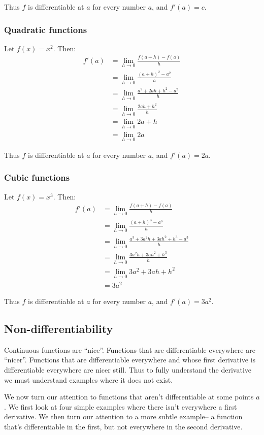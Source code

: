 Thus $f$ is differentiable at $a$ for every number $a$, and $f'(a)=c$.

\subsubsection*{Quadratic functions}
Let $f(x)=x^2$. Then:
\begin{align*}
  f'(a)&=\lim_{h\to0}\frac{f(a+h)-f(a)}{h}\\
       &=\lim_{h\to0}\frac{(a+h)^2-a^2}{h}\\
       &=\lim_{h\to0}\frac{a^2+2ah+h^2-a^2}{h}\\
       &=\lim_{h\to0}\frac{2ah+h^2}{h}\\
       &=\lim_{h\to0}2a+h\\
       &=\lim_{h\to0}2a
\end{align*}

Thus $f$ is differentiable at $a$ for every number $a$, and $f'(a)=2a$.

\subsubsection*{Cubic functions}
Let $f(x)=x^3$. Then:
\begin{align*}
  f'(a)&=\lim_{h\to0}\frac{f(a+h)-f(a)}{h}\\
       &=\lim_{h\to0}\frac{(a+h)^3-a^3}{h}\\
       &=\lim_{h\to0}\frac{a^3+3a^2h+3ah^2+h^3-a^3}{h}\\
       &=\lim_{h\to0}\frac{3a^2h+3ah^2+h^3}{h}\\
       &=\lim_{h\to0}3a^2+3ah+h^2\\
       &=3a^2
\end{align*}

Thus $f$ is differentiable at $a$ for every number $a$, and $f'(a)=3a^2$.

\subsection{Non-differentiability}
Continuous functions are ``nice''. Functions that are differentiable
everywhere are ``nicer''. Functions that are differentiable everywhere
and whose first derivative is differentiable everywhere are nicer
still. Thus to fully understand the derivative we must understand
examples where it does not exist.

\vs

We now turn our attention to functions that aren't differentiable at
some points $a$. We first look at four simple examples where there
isn't everywhere a first derivative. We then turn our attention to a
more subtle example-- a function that's differentiable in the first,
but not everywhere in the second derivative.

